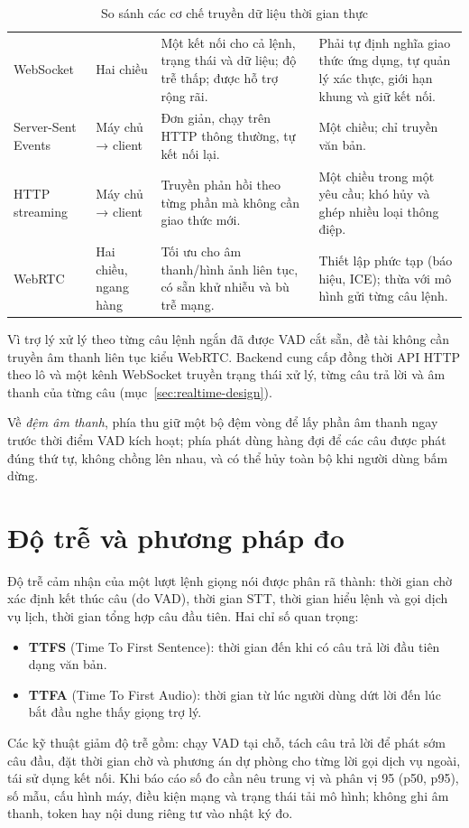 \begin{table}[!htbp]
\caption{So sánh các cơ chế truyền dữ liệu thời gian thực}\label{tab:realtime}
\bang
\begin{tabularx}{\textwidth}{|L{2.5cm}|L{2.4cm}|Y|Y|}\hline
{} &  &  & \\\hline
WebSocket \cite{rfc6455} & Hai chiều & Một kết nối cho cả lệnh, trạng thái và dữ liệu; độ trễ thấp; được hỗ trợ rộng rãi. & Phải tự định nghĩa giao thức ứng dụng, tự quản lý xác thực, giới hạn khung và giữ kết nối.\\\hline
Server-Sent Events \cite{sse} & Máy chủ → client & Đơn giản, chạy trên HTTP thông thường, tự kết nối lại. & Một chiều; chỉ truyền văn bản.\\\hline
HTTP streaming & Máy chủ → client & Truyền phản hồi theo từng phần mà không cần giao thức mới. & Một chiều trong một yêu cầu; khó hủy và ghép nhiều loại thông điệp.\\\hline
WebRTC \cite{webrtc} & Hai chiều, ngang hàng & Tối ưu cho âm thanh/hình ảnh liên tục, có sẵn khử nhiễu và bù trễ mạng. & Thiết lập phức tạp (báo hiệu, ICE); thừa với mô hình gửi từng câu lệnh.\\\hline
\end{tabularx}
\end{table}
Vì trợ lý xử lý theo từng câu lệnh ngắn đã được VAD cắt sẵn, đề tài không cần truyền âm thanh liên tục kiểu WebRTC. Backend cung cấp đồng thời API HTTP theo lô và một kênh WebSocket truyền trạng thái xử lý, từng câu trả lời và âm thanh của từng câu (mục~\ref{sec:realtime-design}).

Về \textit{đệm âm thanh}, phía thu giữ một bộ đệm vòng để lấy phần âm thanh ngay trước thời điểm VAD kích hoạt; phía phát dùng hàng đợi để các câu được phát đúng thứ tự, không chồng lên nhau, và có thể hủy toàn bộ khi người dùng bấm dừng.

\section{Độ trễ và phương pháp đo}
Độ trễ cảm nhận của một lượt lệnh giọng nói được phân rã thành: thời gian chờ xác định kết thúc câu (do VAD), thời gian STT, thời gian hiểu lệnh và gọi dịch vụ lịch, thời gian tổng hợp câu đầu tiên. Hai chỉ số quan trọng:
\begin{itemize}
  \item \textbf{TTFS} (Time To First Sentence): thời gian đến khi có câu trả lời đầu tiên dạng văn bản.
  \item \textbf{TTFA} (Time To First Audio): thời gian từ lúc người dùng dứt lời đến lúc bắt đầu nghe thấy giọng trợ lý.
\end{itemize}
Các kỹ thuật giảm độ trễ gồm: chạy VAD tại chỗ, tách câu trả lời để phát sớm câu đầu, đặt thời gian chờ và phương án dự phòng cho từng lời gọi dịch vụ ngoài, tái sử dụng kết nối. Khi báo cáo số đo cần nêu trung vị và phân vị 95 (p50, p95), số mẫu, cấu hình máy, điều kiện mạng và trạng thái tải mô hình; không ghi âm thanh, token hay nội dung riêng tư vào nhật ký đo.

